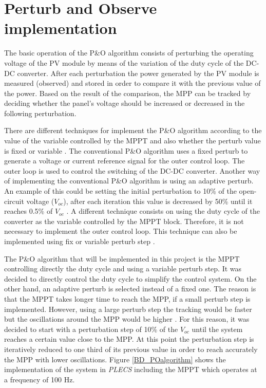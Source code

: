 \section{Perturb and Observe implementation}\label{MPPTImplementation}

The basic operation of the P\&O algorithm consists of perturbing the operating voltage of the PV module by means of the variation of the duty cycle of the DC-DC converter. After each perturbation the power generated by the PV module is measured (observed) and stored in order to compare it with the previous value of the power. Based on the result of the comparison, the MPP can be tracked by deciding whether the panel's voltage should be increased or decreased in the following perturbation.

There are different techniques for implement the P\&O algorithm according to the value of the variable controlled by the MPPT and also whether the perturb value is fixed or variable \cite{implementationPandO}. The conventional P\&O algorithm uses a fixed perturb to generate a voltage or current reference signal for the outer control loop. The outer loop is used to control the switching of the DC-DC converter. Another way of implementing the conventional P\&O algorithm is using an adaptive perturb. An example of this could be setting the initial perturbation to 10\% of the open-circuit voltage ($V_{oc}$), after each iteration this value is decreased by 50\% until it reaches 0.5\% of $V_{oc}$ \cite{implementationPandO}. A different technique consists on using the duty cycle of the converter as the variable controlled by the MPPT block. Therefore, it is not necessary to implement the outer control loop. This technique can also be implemented using fix or variable perturb step \cite{implementationPandO}. 

The P\&O algorithm that will be implemented in this project is the MPPT controlling directly the duty cycle and using a variable perturb step. It was decided to directly control the duty cycle to simplify the control system. On the other hand, an adaptive perturb is selected instead of a fixed one. The reason is that the MPPT takes longer time to reach the MPP, if a small perturb step is implemented. However, using a large perturb step the tracking would be faster but the oscillations around the MPP would be higher \cite{implementationPandO}. For this reason, it was decided to start with a perturbation step of 10\% of the $V_{oc}$ until the system reaches a certain value close to the MPP. At this point the perturbation step is iteratively reduced to one third of its previous value in order to reach accurately the MPP with lower oscillations. Figure \ref{BD_POalgorithm} shows the implementation of the system in \textit{PLECS} including the MPPT which operates at a frequency of 100 Hz. 

